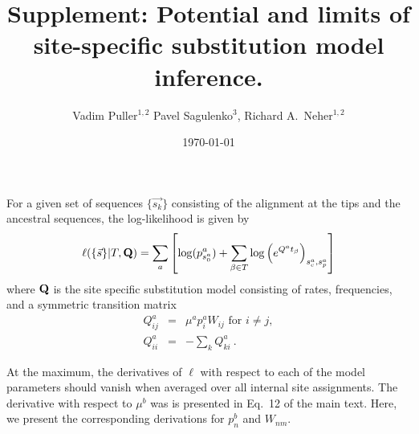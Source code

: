 \documentclass[aps,rmp,onecolumn]{revtex4}
\newcommand{\mat}[1]{{\bf #1}}
\newcommand{\eqp}{p}
\newcommand{\lh}{\ell}
\begin{document}
\renewcommand{\thefigure}{S\arabic{figure}}
\renewcommand{\thetable}{S\arabic{table}}
\setcounter{figure}{0}
\setcounter{table}{0}

\title{Supplement: Potential and limits of site-specific substitution model inference.}
\author{Vadim Puller$^{1,2}$ Pavel Sagulenko$^{3}$, Richard A.~Neher$^{1,2}$}

\date{\today}
\maketitle

For a given set of sequences $\{\vec{s_k}\}$ consisting of the alignment at the tips and the ancestral sequences, the log-likelihood is given by
\begin{equation}
	\label{eq:logLH}
	\lh(\{\vec{s}\} |T, \mat{Q}) = \sum_a \left[\log(\eqp^a_{s^{a}_0}) + \sum_{\beta\in T} \log\left( e^{Q^at_\beta} \right)_{s^a_c, s^a_p}\right]
\end{equation}
where $\mat{Q}$ is the site specific substitution model consisting of rates, frequencies, and a symmetric transition matrix
\begin{eqnarray}
Q^{a}_{ij} &=& \mu^{a}\eqp^{a}_{i} W_{ij} \textrm{ for } i\neq j,\nonumber \\
Q^{a}_{ii} &=& -\sum_k Q^{a}_{ki} \ .
\label{eq:Qij_supp}
\end{eqnarray}

At the maximum, the derivatives of $\lh$ with respect to each of the model parameters should vanish when averaged over all internal site assignments.
The derivative with respect to $\mu^b$ was is presented in Eq.~12 of the main text.
Here, we present the corresponding derivations for $\eqp^b_n$ and $W_{nm}$.
\end{document}
